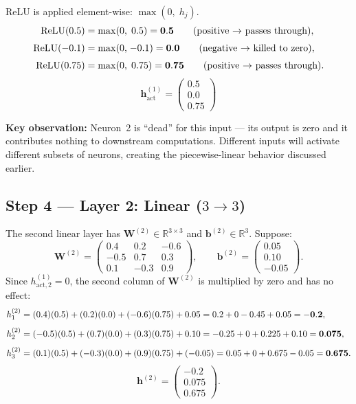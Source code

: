 \documentclass[11pt,a4paper]{article}
\newcommand{\R}{\mathbb{R}}
\newcommand{\bW}{\mathbf{W}}
\newcommand{\bb}{\mathbf{b}}
\newcommand{\bh}{\mathbf{h}}
\begin{document}
ReLU is applied element-wise: $\max(0,\; h_j)$.
\begin{align}
  \text{ReLU}(0.5)  &= \max(0,\; 0.5)  = \mathbf{0.5}
    \qquad\text{(positive $\to$ passes through)}, \notag \\[3pt]
  \text{ReLU}(-0.1) &= \max(0,\;\! -0.1) = \mathbf{0.0}
    \qquad\text{(negative $\to$ killed to zero)}, \notag \\[3pt]
  \text{ReLU}(0.75) &= \max(0,\; 0.75) = \mathbf{0.75}
    \qquad\text{(positive $\to$ passes through)}. \notag
\end{align}
\[
  \boxed{\bh^{(1)}_{\text{act}} = \begin{pmatrix} 0.5 \\ 0.0 \\ 0.75 \end{pmatrix}}
\]

\textbf{Key observation:} Neuron~2 is ``dead'' for this input ---
its output is zero and it contributes nothing to downstream
computations.  Different inputs will activate different subsets of
neurons, creating the piecewise-linear behavior discussed earlier.

\subsection{Step 4 --- Layer 2: Linear ($3 \to 3$)}

The second linear layer has $\bW^{(2)} \in \R^{3 \times 3}$ and
$\bb^{(2)} \in \R^3$.  Suppose:
\[
  \bW^{(2)} =
  \begin{pmatrix}
     0.4 &  0.2 & -0.6 \\
    -0.5 &  0.7 &  0.3 \\
     0.1 & -0.3 &  0.9
  \end{pmatrix},
  \qquad
  \bb^{(2)} =
  \begin{pmatrix} 0.05 \\ 0.10 \\ -0.05 \end{pmatrix}.
\]
Since $h^{(1)}_{\text{act},2} = 0$, the second column of $\bW^{(2)}$
is multiplied by zero and has no effect:
\begin{align}
  h^{(2)}_1 &= (0.4)(0.5) + (0.2)(0.0) + (-0.6)(0.75) + 0.05
             = 0.2 + 0 - 0.45 + 0.05
             = \mathbf{-0.2}, \notag \\[4pt]
  h^{(2)}_2 &= (-0.5)(0.5) + (0.7)(0.0) + (0.3)(0.75) + 0.10
             = -0.25 + 0 + 0.225 + 0.10
             = \mathbf{0.075}, \notag \\[4pt]
  h^{(2)}_3 &= (0.1)(0.5) + (-0.3)(0.0) + (0.9)(0.75) + (-0.05)
             = 0.05 + 0 + 0.675 - 0.05
             = \mathbf{0.675}. \notag
\end{align}
\[
  \bh^{(2)} = \begin{pmatrix} -0.2 \\ 0.075 \\ 0.675 \end{pmatrix}.
\]
\end{document}
